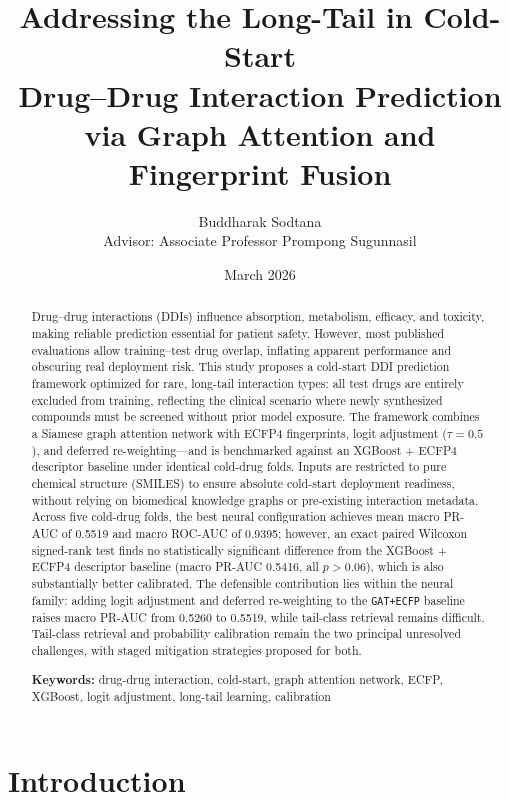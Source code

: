 \documentclass[11pt,a4paper,twocolumn]{article}
\title{Addressing the Long-Tail in Cold-Start\\
       Drug--Drug Interaction Prediction\\
       via Graph Attention and Fingerprint Fusion}
\author{Buddharak Sodtana\\[1em]
        Advisor: Associate Professor Prompong Sugunnasil}
\date{March 2026}
\begin{document}
\maketitle

\begin{abstract}
Drug--drug interactions (DDIs) influence absorption, metabolism, efficacy, and toxicity,
making reliable prediction essential for patient safety.
However, most published evaluations allow training--test drug overlap, inflating
apparent performance and obscuring real deployment risk.
This study proposes a cold-start DDI prediction framework optimized for rare,
long-tail interaction types: all test drugs are entirely excluded from training,
reflecting the clinical scenario where newly synthesized compounds must be screened
without prior model exposure.
The framework combines a Siamese graph attention network with ECFP4 fingerprints,
logit adjustment ($\tau=0.5$), and deferred re-weighting---and is benchmarked against
an XGBoost + ECFP4 descriptor baseline under identical cold-drug folds.
Inputs are restricted to pure chemical structure (SMILES) to ensure absolute
cold-start deployment readiness, without relying on biomedical knowledge graphs
or pre-existing interaction metadata.
Across five cold-drug folds, the best neural configuration achieves mean macro
PR-AUC of 0.5519 and macro ROC-AUC of 0.9395; however, an exact paired
Wilcoxon signed-rank test finds no statistically significant difference
from the XGBoost + ECFP4 descriptor baseline (macro PR-AUC 0.5416,
all $p > 0.06$), which is also substantially better calibrated.
The defensible contribution lies within the neural family:
adding logit adjustment and deferred re-weighting to the
\texttt{GAT+ECFP} baseline raises macro PR-AUC from 0.5260 to 0.5519,
while tail-class retrieval remains difficult.
Tail-class retrieval and probability calibration remain the two
principal unresolved challenges, with staged mitigation strategies proposed for both.

\noindent\textbf{Keywords:} drug-drug interaction, cold-start, graph attention network,
ECFP, XGBoost, logit adjustment, long-tail learning, calibration
\end{abstract}

\section{Introduction}
\end{document}
